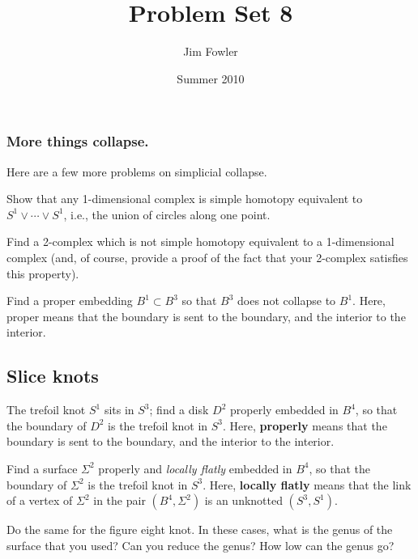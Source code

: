 \documentclass[12pt]{pset}
\title{Problem Set 8}
\author{Jim Fowler}
\date{Summer 2010}
\begin{document}
\maketitle

\subsubsection*{More things collapse.} Here are a few more problems
on simplicial collapse.


\begin{requiredproblem}
  Show that any 1-dimensional complex is simple homotopy equivalent to
  $S^1 \vee \cdots \vee S^1$, i.e., the union of circles along one point.
\end{requiredproblem}

\begin{requiredproblem}
  Find a 2-complex which is not simple homotopy equivalent to a
  1-dimensional complex (and, of course, provide a proof of the fact
  that your 2-complex satisfies this property).
\end{requiredproblem}

\begin{problem}
  Find a proper embedding $B^1 \subset B^3$ so that $B^3$ does not
  collapse to $B^1$.  Here, proper means that the boundary is sent to
  the boundary, and the interior to the interior.
\end{problem}

\subsection*{Slice knots}

\begin{problem}
 The trefoil knot $S^1$ sits in $S^3$; find a disk $D^2$
 properly embedded in $B^4$, so that the boundary of $D^2$ is
 the trefoil knot in $S^3$.  Here, \textbf{properly} means that the
 boundary is sent to the boundary, and the interior to the interior.
\end{problem}

\begin{problem}
  Find a surface $\Sigma^2$ properly and \textit{locally flatly}
  embedded in $B^4$, so that the boundary of $\Sigma^2$ is the trefoil
  knot in $S^3$.  Here, \textbf{locally flatly} means that the link of
  a vertex of $\Sigma^2$ in the pair $(B^4,\Sigma^2)$ is an unknotted
  $(S^3,S^1)$.
\end{problem}

\begin{problem}
  Do the same for the figure eight knot.  In these cases, what is the
  genus of the surface that you used?  Can you reduce the genus?  How
  low can the genus go?
\end{problem}
\end{document}
